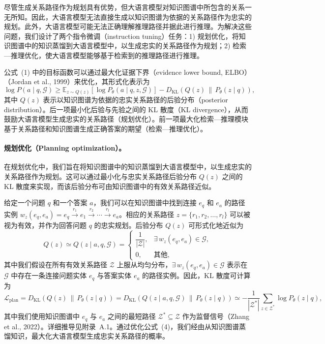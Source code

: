 \documentclass[11pt,UTF8,fontset=fandol]{ctexart}
\begin{document}
尽管生成关系路径作为规划具有优势，但大语言模型对知识图谱中所包含的关系一无所知。因此，大语言模型无法直接生成以知识图谱为依据的关系路径作为忠实的规划。此外，大语言模型可能无法正确理解推理路径并据此进行推理。为解决这些问题，我们设计了两个指令微调（instruction tuning）任务：1) 规划优化，将知识图谱中的知识蒸馏到大语言模型中，以生成忠实的关系路径作为规划；2) 检索—推理优化，使大语言模型能够基于检索到的推理路径进行推理。

公式~(1) 中的目标函数可以通过最大化证据下界（evidence lower bound, ELBO）（Jordan et al., 1999）来优化，其形式化表示为
\begin{equation}
\log P(a \mid q, \mathcal{G}) \geq \mathbb{E}_{z \sim Q(z)} \left[ \log P_\theta(a \mid q, z, \mathcal{G}) \right] - D_{\mathrm{KL}}\!\left( Q(z) \,\|\, P_\theta(z \mid q) \right),
\end{equation}
其中 $Q(z)$ 表示以知识图谱为依据的忠实关系路径的后验分布（posterior distribution）。后一项最小化后验与先验之间的 KL 散度（KL divergence），从而鼓励大语言模型生成忠实的关系路径（规划优化）。前一项最大化检索—推理模块基于关系路径和知识图谱生成正确答案的期望（检索—推理优化）。

\paragraph{规划优化（Planning optimization）。}
在规划优化中，我们旨在将知识图谱中的知识蒸馏到大语言模型中，以生成忠实的关系路径作为规划。这可以通过最小化与忠实关系路径后验分布 $Q(z)$ 之间的 KL 散度来实现，而该后验分布可由知识图谱中的有效关系路径近似。

给定一个问题 $q$ 和一个答案 $a$，我们可以在知识图谱中找到连接 $e_q$ 和 $e_a$ 的路径实例 $w_z(e_q, e_a) = e_q \xrightarrow{r_1} e_1 \xrightarrow{r_2} \cdots \xrightarrow{r_l} e_a$。相应的关系路径 $z = \{r_1, r_2, \ldots, r_l\}$ 可以被视为有效，并作为回答问题 $q$ 的忠实规划。后验分布 $Q(z)$ 可形式化地近似为
\begin{equation}
Q(z) \simeq Q(z \mid a, q, \mathcal{G}) =
\begin{cases}
\dfrac{1}{|\mathcal{Z}|}, & \exists\, w_z(e_q, e_a) \in \mathcal{G}, \\[1.2ex]
0, & \text{其他},
\end{cases}
\end{equation}
其中我们假设在所有有效关系路径 $\mathcal{Z}$ 上服从均匀分布，$\exists\, w_z(e_q, e_a) \in \mathcal{G}$ 表示在 $\mathcal{G}$ 中存在一条连接问题实体 $e_q$ 与答案实体 $e_a$ 的路径实例。因此，KL 散度可计算为
\begin{equation}
\mathcal{L}_{\text{plan}} = D_{\mathrm{KL}}\!\left( Q(z) \,\|\, P_\theta(z \mid q) \right) = D_{\mathrm{KL}}\!\left( Q(z \mid a, q, \mathcal{G}) \,\|\, P_\theta(z \mid q) \right) \simeq -\frac{1}{|\mathcal{Z}^*|} \sum_{z \in \mathcal{Z}^*} \log P_\theta(z \mid q),
\end{equation}
其中我们使用知识图谱中 $e_q$ 与 $e_a$ 之间的最短路径 $\mathcal{Z}^* \subseteq \mathcal{Z}$ 作为监督信号（Zhang et al., 2022）。详细推导见附录~A.1。通过优化公式~(4)，我们经由从知识图谱蒸馏知识，最大化大语言模型生成忠实关系路径的概率。
\end{document}
